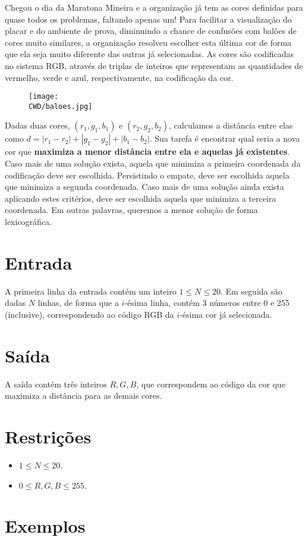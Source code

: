 Chegou o dia da Maratona Mineira e a organização já tem as cores definidas para quase todos os problemas, faltando apenas um!
Para facilitar a visualização do placar e do ambiente de prova, diminuindo a chance de confusões com balões de cores muito similares,
a organização resolveu escolher esta última cor de forma que ela seja muito diferente das outras já selecionadas. As cores são codificadas
no sistema RGB, através de triplas de inteiros que representam as quantidades de vermelho, verde e azul, respectivamente,
na codificação da cor.

\begin{figure}[H]
    \centering
    \texttt{[image: \\CWD/baloes.jpg]}
\end{figure}

Dadas duas cores, $(r_1,g_1,b_1)$ e $(r_2,g_2,b_2)$, calculamos a distância entre elas como $d = |r_1-r_2| + |g_1-g_2| + |b_1-b_2|$.
Sua tarefa é encontrar qual seria a nova cor que \textbf{maximiza a menor distância entre ela e aquelas já existentes}. Caso mais de uma solução exista,
aquela que minimiza a primeira coordenada da codificação deve ser escolhida. Persistindo o empate, deve ser escolhida aquela que minimiza
a segunda coordenada. Caso mais de uma solução ainda exista aplicando estes critérios, deve ser escolhida aquela que minimiza a terceira coordenada. Em outras palavras, queremos a menor solução de forma lexicográfica.

\section*{Entrada}

A primeira linha da entrada contém um inteiro $1 \leq N \leq 20$. Em seguida são dadas $N$ linhas, de forma que a $i$-ésima linha, contém 3 números
entre 0 e 255 (inclusive), correspondendo ao código RGB da $i$-ésima cor já selecionada.

\section*{Saída}

A saída contém três inteiros $R, G, B$, que correspondem ao código da cor que maximiza a distância para as demais cores.

\section*{Restrições}

\begin{itemize}
\item $1 \leq N \leq 20$.
\item $0 \leq R, G, B \leq 255$.
\end{itemize}


\section*{Exemplos}

\exemplo
